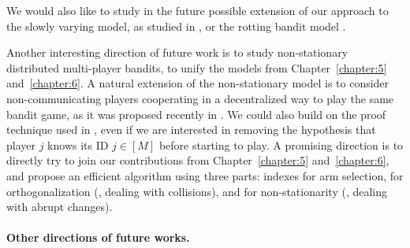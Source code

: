 We would also like to study in the future possible extension of our approach to the slowly varying model, as studied in \cite{Besbes14stochastic,Louedec16,WeiSrivastava18Abruptly}, or the rotting bandit model \cite{Seznec2018}.

Another interesting direction of future work is to study non-stationary distributed multi-player bandits, to unify the models from Chapter~\ref{chapter:5} and~\ref{chapter:6}.
A natural extension of the non-stationary model is to consider non-communicating players cooperating in a decentralized way to play the same bandit game, as it was proposed recently in \cite{WeiSrivastava18Distributed}.
%
We could also build on the proof technique used in \cite{WeiSrivastava18Abruptly}, even if we are interested in removing the hypothesis that player $j$ knows its ID $j\in[M]$ before starting to play.
%
A promising direction is to directly try to join our contributions from Chapter~\ref{chapter:5} and~\ref{chapter:6}, and propose an efficient algorithm using three parts:
\klUCB{} indexes for arm selection,
\MCTopM{} for orthogonalization (\ie, dealing with collisions),
and \GLRklUCB{} for non-stationarity (\ie, dealing with abrupt changes).



\paragraph{Other directions of future works.}





